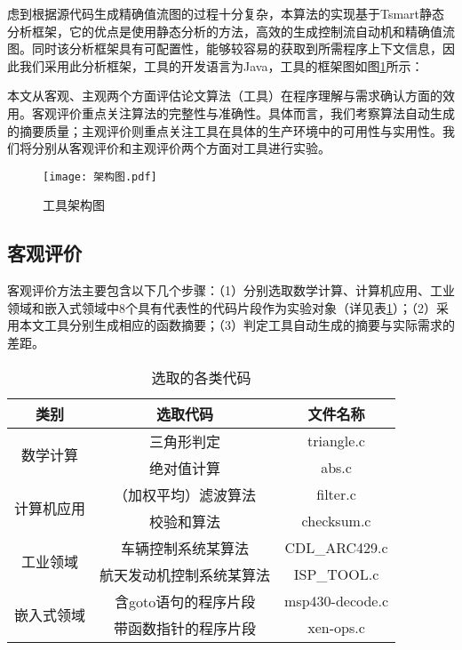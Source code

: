 虑到根据源代码生成精确值流图的过程十分复杂，本算法的实现基于Tsmart静态分析框架，它的优点是使用静态分析的方法，高效的生成控制流自动机和精确值流图。同时该分析框架具有可配置性，能够较容易的获取到所需程序上下文信息，因此我们采用此分析框架，工具的开发语言为Java，工具的框架图如图\ref{fig:架构图}所示：

本文从客观、主观两个方面评估论文算法（工具）在程序理解与需求确认方面的效用。客观评价重点关注算法的完整性与准确性。具体而言，我们考察算法自动生成的摘要质量；主观评价则重点关注工具在具体的生产环境中的可用性与实用性。我们将分别从客观评价和主观评价两个方面对工具进行实验。

\begin{figure}[H]
	\centering
	\texttt{[image: 架构图.pdf]}
	\caption{工具架构图}
	\label{fig:架构图}
\end{figure}

\subsection{客观评价}

客观评价方法主要包含以下几个步骤：（1）分别选取数学计算、计算机应用、工业领域和嵌入式领域中8个具有代表性的代码片段作为实验对象（详见表\ref{tab:selectedCodes}）；（2）采用本文工具分别生成相应的函数摘要；（3）判定工具自动生成的摘要与实际需求的差距。

\begin{table}[htb]
	\centering
	\caption{选取的各类代码}
	\label{tab:selectedCodes}
	\begin{tabular}{|c|c|c|}
		\hline
		类别 & 选取代码 & 文件名称 \\ \hline
		\multirow{2}{*}{数学计算} & 三角形判定 & triangle.c \\ \cline{2-3} 
		& 绝对值计算 & abs.c \\ \hline
		\multirow{2}{*}{计算机应用} & （加权平均）滤波算法 & filter.c \\ \cline{2-3} 
		& 校验和算法 & checksum.c \\ \hline
		\multirow{2}{*}{工业领域} & 车辆控制系统某算法 & CDL\_ARC429.c \\ \cline{2-3} 
		& 航天发动机控制系统某算法 & ISP\_TOOL.c \\ \hline
		\multirow{2}{*}{嵌入式领域} & 含goto语句的程序片段 & msp430-decode.c \\ \cline{2-3} 
		& 带函数指针的程序片段 & xen-ops.c \\ \hline
	\end{tabular}
\end{table}

